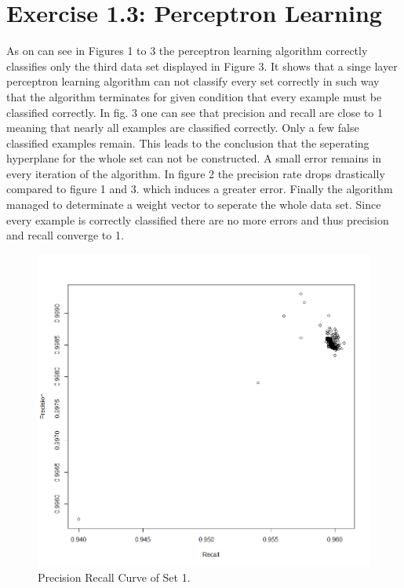 \documentclass{scrartcl}
\begin{document}
\section{Exercise 1.3: Perceptron Learning}

As on can see in Figures 1 to 3 the perceptron learning algorithm correctly classifies only the third data set displayed in Figure 3. 
It shows that a singe layer perceptron learning algorithm can not classify every set correctly in such way that the algorithm terminates for given condition that every example must be classified correctly.
In fig. 3 one can see that precision and recall are close to 1 meaning that nearly all examples are classified correctly. Only a few false classified examples remain. This leads to the conclusion that the seperating hyperplane for the whole set can not be constructed.
A small error remains in every iteration of the algorithm. In figure 2 the precision rate drops drastically compared to figure 1 and 3. which induces a greater error. Finally the algorithm managed to determinate a weight vector to seperate the whole data set.
Since every example is correctly classified there are no more errors and thus precision and recall converge to 1.

\begin{figure}[ht]
\begin{center}
\includegraphics[scale=0.3]{PerceptronSet1.png}
\end{center}
\caption{Precision Recall Curve of Set 1.}
\label{Img:PrecisionRecallS1}
\end{figure}
\end{document}
